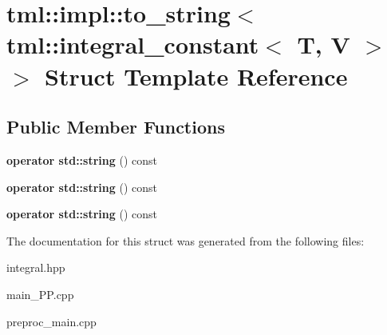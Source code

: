 \hypertarget{structtml_1_1impl_1_1to__string_3_01tml_1_1integral__constant_3_01T_00_01V_01_4_01_4}{\section{tml\+:\+:impl\+:\+:to\+\_\+string$<$ tml\+:\+:integral\+\_\+constant$<$ T, V $>$ $>$ Struct Template Reference}
\label{structtml_1_1impl_1_1to__string_3_01tml_1_1integral__constant_3_01T_00_01V_01_4_01_4}
}
\subsection*{Public Member Functions}
\begin{DoxyCompactItemize}
\item 
\hypertarget{structtml_1_1impl_1_1to__string_3_01tml_1_1integral__constant_3_01T_00_01V_01_4_01_4_ad3c348acc1e162643fce6bdd3ea71d69}{{\bfseries operator std\+::string} () const }\label{structtml_1_1impl_1_1to__string_3_01tml_1_1integral__constant_3_01T_00_01V_01_4_01_4_ad3c348acc1e162643fce6bdd3ea71d69}

\item 
\hypertarget{structtml_1_1impl_1_1to__string_3_01tml_1_1integral__constant_3_01T_00_01V_01_4_01_4_ad3c348acc1e162643fce6bdd3ea71d69}{{\bfseries operator std\+::string} () const }\label{structtml_1_1impl_1_1to__string_3_01tml_1_1integral__constant_3_01T_00_01V_01_4_01_4_ad3c348acc1e162643fce6bdd3ea71d69}

\item 
\hypertarget{structtml_1_1impl_1_1to__string_3_01tml_1_1integral__constant_3_01T_00_01V_01_4_01_4_ad3c348acc1e162643fce6bdd3ea71d69}{{\bfseries operator std\+::string} () const }\label{structtml_1_1impl_1_1to__string_3_01tml_1_1integral__constant_3_01T_00_01V_01_4_01_4_ad3c348acc1e162643fce6bdd3ea71d69}

\end{DoxyCompactItemize}


The documentation for this struct was generated from the following files\+:\begin{DoxyCompactItemize}
\item 
integral.\+hpp\item 
main\+\_\+\+P\+P.\+cpp\item 
preproc\+\_\+main.\+cpp\end{DoxyCompactItemize}
